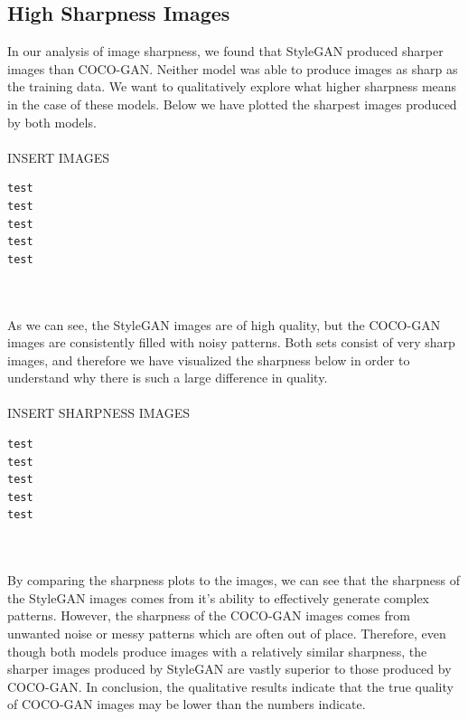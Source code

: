\documentclass[10pt]{article}
\begin{document}
\begin{multicols*}{2}
        \subsection{High Sharpness Images}
        In our analysis of image sharpness, we found that StyleGAN produced sharper images than COCO-GAN.
        Neither model was able to produce images as sharp as the training data.
        We want to qualitatively explore what higher sharpness means in the case of these models.
        Below we have plotted the sharpest images produced by both models.
        \\\\
        INSERT IMAGES
        \begin{verbatim}
test
test
test
test
test
\end{verbatim}
        \\\\
        As we can see, the StyleGAN images are of high quality, but the COCO-GAN images are consistently filled with noisy patterns.
        Both sets consist of very sharp images, and therefore we have visualized the sharpness below in order to understand why there is such a large difference in quality.
        \\\\
        INSERT SHARPNESS IMAGES
        \begin{verbatim}
test
test
test
test
test
\end{verbatim}
        \\\\
        By comparing the sharpness plots to the images, we can see that the sharpness of the StyleGAN images comes from it's ability to effectively generate complex patterns.
        However, the sharpness of the COCO-GAN images comes from unwanted noise or messy patterns which are often out of place.
        Therefore, even though both models produce images with a relatively similar sharpness, the sharper images produced by StyleGAN are vastly superior to those produced by COCO-GAN.
        In conclusion, the qualitative results indicate that the true quality of COCO-GAN images may be lower than the numbers indicate.


\end{multicols*}
\end{document}
